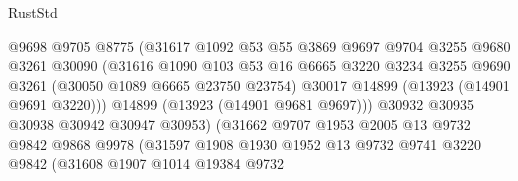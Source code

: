 \begin{lexlean}{RustStd}
\begin{coremodule}
                                  @9698
                                  @9705
                                  @8775
                                  (@31617
                                    @1092
                                    @53
                                    @55
                                    @3869
                                    @9697
                                    @9704
                                    @3255
                                    @9680
                                    @3261
                                    @30090
                                    (@31616
                                      @1090
                                      @103
                                      @53
                                      @16
                                      @6665
                                      @3220
                                      @3234
                                      @3255
                                      @9690
                                      @3261
                                      (@30050 @1089 @6665 @23750 @23754)
                                      @30017
                                      @14899
                                      (@13923 (@14901 @9691 @3220)))
                                    @14899
                                    (@13923 (@14901 @9681 @9697)))
                                  @30932
                                  @30935
                                  @30938
                                  @30942
                                  @30947
                                  @30953)
                                (@31662
                                  @9707
                                  @1953
                                  @2005
                                  @13
                                  @9732
                                  @9842
                                  @9868
                                  @9978
                                  (@31597
                                    @1908
                                    @1930
                                    @1952
                                    @13
                                    @9732
                                    @9741
                                    @3220
                                    @9842
                                    (@31608
                                      @1907
                                      @1014
                                      @19384
                                      @9732

\end{coremodule}
\end{lexlean}

